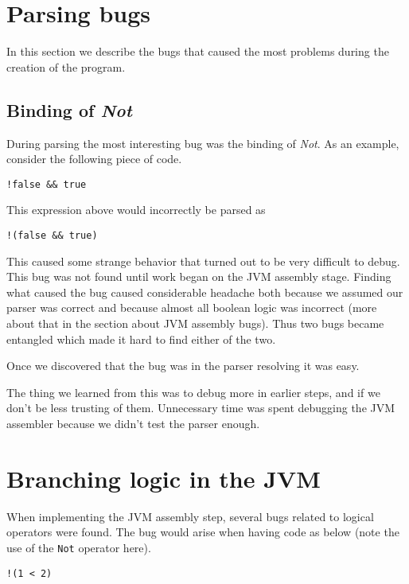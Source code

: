 \documentclass[a4paper]{article}
\begin{document}
\appendix

\section{Parsing bugs}
In this section we describe the bugs that caused the most problems during the creation of the program.

\subsection{Binding of \textit{Not}}

During parsing the most interesting bug was the binding of \textit{Not}. As an
example, consider the following piece of code.

\begin{lstlisting}
!false && true
\end{lstlisting}

This expression above would incorrectly be parsed as

\begin{lstlisting}
!(false && true)
\end{lstlisting}

This caused some strange behavior that turned out to be very difficult to debug.
This bug was not found until work began on the JVM assembly stage. Finding what
caused the bug caused considerable headache both because we assumed our parser
was correct and because almost all boolean logic was incorrect (more about that in
the section about JVM assembly bugs). Thus two bugs became entangled which made
it hard to find either of the two.

Once we discovered that the bug was in the parser resolving it was easy.

The thing we learned from this was to debug more in earlier steps, and if we don't
be less trusting of them. Unnecessary time was spent debugging the JVM assembler
because we didn't test the parser enough.

\section{Branching logic in the JVM}

When implementing the JVM assembly step, several bugs related to logical
operators were found. The bug would arise when having code as below (note
the use of the \texttt{Not} operator here).

\begin{lstlisting}
!(1 < 2)
\end{lstlisting}
\end{document}
